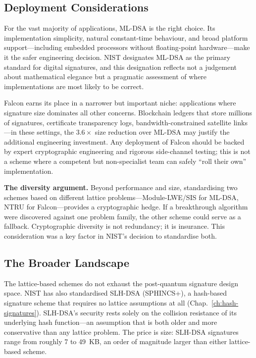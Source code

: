 \subsection{Deployment Considerations}
\label{subsec:deployment-considerations}

For the vast majority of applications, ML-DSA is the right choice.  Its implementation simplicity, natural constant-time behaviour, and broad platform support---including embedded processors without floating-point hardware---make it the safer engineering decision.  NIST designates ML-DSA as the primary standard for digital signatures, and this designation reflects not a judgement about mathematical elegance but a pragmatic assessment of where implementations are most likely to be correct.

Falcon earns its place in a narrower but important niche: applications where signature size dominates all other concerns.  Blockchain ledgers that store millions of signatures, certificate transparency logs, bandwidth-constrained satellite links---in these settings, the $3.6\times$ size reduction over ML-DSA may justify the additional engineering investment.  Any deployment of Falcon should be backed by expert cryptographic engineering and rigorous side-channel testing; this is not a scheme where a competent but non-specialist team can safely ``roll their own'' implementation.

\begin{svgraybox}
\textbf{The diversity argument.}  Beyond performance and size, standardising two schemes based on different lattice problems---Module-LWE/SIS for ML-DSA, NTRU for Falcon---provides a cryptographic hedge.  If a breakthrough algorithm were discovered against one problem family, the other scheme could serve as a fallback.  Cryptographic diversity is not redundancy; it is insurance.  This consideration was a key factor in NIST's decision to standardise both.
\end{svgraybox}

\subsection{The Broader Landscape}
\label{subsec:broader-landscape}

The lattice-based schemes do not exhaust the post-quantum signature design space.  NIST has also standardised SLH-DSA (SPHINCS+), a hash-based signature scheme that requires no lattice assumptions at all (Chap.~\ref{ch:hash-signatures}).  SLH-DSA's security rests solely on the collision resistance of its underlying hash function---an assumption that is both older and more conservative than any lattice problem.  The price is size: SLH-DSA signatures range from roughly 7 to 49~KB, an order of magnitude larger than either lattice-based scheme.

